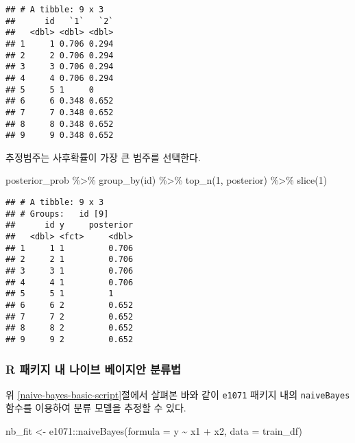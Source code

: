 \documentclass[
]{book}
\newenvironment{Shaded}{\begin{snugshade}}{\end{snugshade}}
\newcommand{\AttributeTok}[1]{\textcolor[rgb]{0.77,0.63,0.00}{#1}}
\newcommand{\DecValTok}[1]{\textcolor[rgb]{0.00,0.00,0.81}{#1}}
\newcommand{\FunctionTok}[1]{\textcolor[rgb]{0.00,0.00,0.00}{#1}}
\newcommand{\NormalTok}[1]{#1}
\newcommand{\OtherTok}[1]{\textcolor[rgb]{0.56,0.35,0.01}{#1}}
\newcommand{\SpecialCharTok}[1]{\textcolor[rgb]{0.00,0.00,0.00}{#1}}
\begin{document}
\begin{verbatim}
## # A tibble: 9 x 3
##      id   `1`   `2`
##   <dbl> <dbl> <dbl>
## 1     1 0.706 0.294
## 2     2 0.706 0.294
## 3     3 0.706 0.294
## 4     4 0.706 0.294
## 5     5 1     0    
## 6     6 0.348 0.652
## 7     7 0.348 0.652
## 8     8 0.348 0.652
## 9     9 0.348 0.652
\end{verbatim}

추정범주는 사후확률이 가장 큰 범주를 선택한다.

\begin{Shaded}
\begin{Highlighting}[]
\NormalTok{posterior\_prob }\SpecialCharTok{\%\textgreater{}\%}
  \FunctionTok{group\_by}\NormalTok{(id) }\SpecialCharTok{\%\textgreater{}\%}
  \FunctionTok{top\_n}\NormalTok{(}\DecValTok{1}\NormalTok{, posterior) }\SpecialCharTok{\%\textgreater{}\%}
  \FunctionTok{slice}\NormalTok{(}\DecValTok{1}\NormalTok{)}
\end{Highlighting}
\end{Shaded}

\begin{verbatim}
## # A tibble: 9 x 3
## # Groups:   id [9]
##      id y     posterior
##   <dbl> <fct>     <dbl>
## 1     1 1         0.706
## 2     2 1         0.706
## 3     3 1         0.706
## 4     4 1         0.706
## 5     5 1         1    
## 6     6 2         0.652
## 7     7 2         0.652
## 8     8 2         0.652
## 9     9 2         0.652
\end{verbatim}

\hypertarget{naive-bayes-pkg}{%
\subsubsection{R 패키지 내 나이브 베이지안 분류법}\label{naive-bayes-pkg}}

위 \ref{naive-bayes-basic-script}절에서 살펴본 바와 같이 \texttt{e1071} 패키지 내의 \texttt{naiveBayes} 함수를 이용하여 분류 모델을 추정할 수 있다.

\begin{Shaded}
\begin{Highlighting}[]
\NormalTok{nb\_fit }\OtherTok{\textless{}{-}}\NormalTok{ e1071}\SpecialCharTok{::}\FunctionTok{naiveBayes}\NormalTok{(}\AttributeTok{formula =}\NormalTok{ y }\SpecialCharTok{\textasciitilde{}}\NormalTok{ x1 }\SpecialCharTok{+}\NormalTok{ x2, }\AttributeTok{data =}\NormalTok{ train\_df)}
\end{Highlighting}
\end{Shaded}
\end{document}
